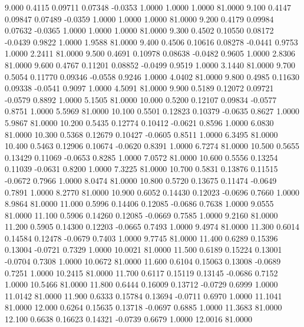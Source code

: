    9.000   0.4115   0.09711   0.07348  -0.0353   1.0000   1.0000   1.0000  81.0000
   9.100   0.4147   0.09847   0.07489  -0.0359   1.0000   1.0000   1.0000  81.0000
   9.200   0.4179   0.09984   0.07632  -0.0365   1.0000   1.0000   1.0000  81.0000
   9.300   0.4502   0.10550   0.08172  -0.0439   0.9822   1.0000   1.9588  81.0000
   9.400   0.4506   0.10616   0.08278  -0.0441   0.9753   1.0000   2.2411  81.0000
   9.500   0.4691   0.10978   0.08638  -0.0482   0.9605   1.0000   2.8306  81.0000
   9.600   0.4767   0.11201   0.08852  -0.0499   0.9519   1.0000   3.1440  81.0000
   9.700   0.5054   0.11770   0.09346  -0.0558   0.9246   1.0000   4.0402  81.0000
   9.800   0.4985   0.11630   0.09338  -0.0541   0.9097   1.0000   4.5091  81.0000
   9.900   0.5189   0.12072   0.09721  -0.0579   0.8892   1.0000   5.1505  81.0000
  10.000   0.5200   0.12107   0.09834  -0.0577   0.8751   1.0000   5.5969  81.0000
  10.100   0.5501   0.12823   0.10379  -0.0635   0.8627   1.0000   5.9867  81.0000
  10.200   0.5435   0.12774   0.10412  -0.0621   0.8596   1.0000   6.0830  81.0000
  10.300   0.5368   0.12679   0.10427  -0.0605   0.8511   1.0000   6.3495  81.0000
  10.400   0.5463   0.12906   0.10674  -0.0620   0.8391   1.0000   6.7274  81.0000
  10.500   0.5655   0.13429   0.11069  -0.0653   0.8285   1.0000   7.0572  81.0000
  10.600   0.5556   0.13254   0.11039  -0.0631   0.8200   1.0000   7.3225  81.0000
  10.700   0.5831   0.13876   0.11515  -0.0672   0.7966   1.0000   8.0474  81.0000
  10.800   0.5720   0.13675   0.11474  -0.0649   0.7891   1.0000   8.2770  81.0000
  10.900   0.6052   0.14430   0.12023  -0.0696   0.7660   1.0000   8.9864  81.0000
  11.000   0.5996   0.14406   0.12085  -0.0686   0.7638   1.0000   9.0555  81.0000
  11.100   0.5906   0.14260   0.12085  -0.0669   0.7585   1.0000   9.2160  81.0000
  11.200   0.5905   0.14300   0.12203  -0.0665   0.7493   1.0000   9.4974  81.0000
  11.300   0.6014   0.14584   0.12478  -0.0679   0.7403   1.0000   9.7745  81.0000
  11.400   0.6289   0.15396   0.13004  -0.0721   0.7329   1.0000  10.0021  81.0000
  11.500   0.6189   0.15224   0.13001  -0.0704   0.7308   1.0000  10.0672  81.0000
  11.600   0.6104   0.15063   0.13008  -0.0689   0.7251   1.0000  10.2415  81.0000
  11.700   0.6117   0.15119   0.13145  -0.0686   0.7152   1.0000  10.5466  81.0000
  11.800   0.6444   0.16009   0.13712  -0.0729   0.6999   1.0000  11.0142  81.0000
  11.900   0.6333   0.15784   0.13694  -0.0711   0.6970   1.0000  11.1041  81.0000
  12.000   0.6264   0.15635   0.13718  -0.0697   0.6885   1.0000  11.3683  81.0000
  12.100   0.6638   0.16623   0.14321  -0.0739   0.6679   1.0000  12.0016  81.0000
